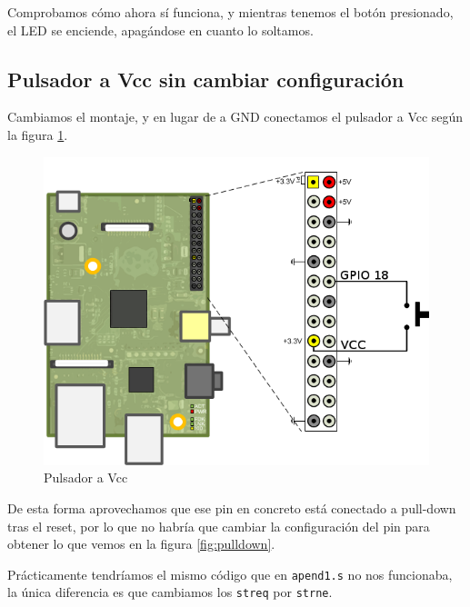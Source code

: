 Comprobamos cómo ahora sí funciona, y mientras tenemos el botón presionado,
el LED se enciende, apagándose en cuanto lo soltamos.

\subsection{Pulsador a Vcc sin cambiar configuración}

Cambiamos el montaje, y en lugar de a GND conectamos el pulsador a Vcc según
la figura \ref{fig:circuito2}.

\begin{figure}[h]
  \centering
    \includegraphics[width=14cm]{graphs/circuito2.png}
  \caption{Pulsador a Vcc}
  \label{fig:circuito2}
\end{figure}

De esta forma aprovechamos que ese pin en concreto está conectado a pull-down tras
el reset, por lo que no habría que cambiar la configuración del pin para obtener
lo que vemos en la figura \ref{fig:pulldown}.

Prácticamente tendríamos el mismo código que en {\tt apend1.s} no nos funcionaba,
la única diferencia es que cambiamos los {\tt streq} por {\tt strne}.

